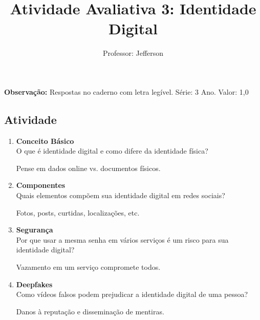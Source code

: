 \documentclass[11pt]{article}
\title{\textcolor{titleblue}{Atividade Avaliativa 3: Identidade Digital}}
\author{Professor: Jefferson}
\date{}
\begin{document}
\maketitle
\vspace{-1cm}

\begin{center}
    \large{\textbf{Observação:} Respostas no caderno com letra legível. \quad Série: 3 Ano. Valor: 1,0}
\end{center}

\begin{multicols}{2}

\section*{Atividade}
\begin{enumerate}

\item \textbf{Conceito Básico}\\
O que é identidade digital e como difere da identidade física?
\begin{tcolorbox}[colback=explanationbg,colframe=titleblue,title=Dica:]
Pense em dados online vs. documentos físicos.
\end{tcolorbox}

\item \textbf{Componentes}\\
Quais elementos compõem sua identidade digital em redes sociais?
\begin{tcolorbox}[colback=explanationbg,colframe=titleblue,title=Dica:]
Fotos, posts, curtidas, localizações, etc.
\end{tcolorbox}

\item \textbf{Segurança}\\
Por que usar a mesma senha em vários serviços é um risco para sua identidade digital?
\begin{tcolorbox}[colback=explanationbg,colframe=titleblue,title=Dica:]
Vazamento em um serviço compromete todos.
\end{tcolorbox}

\item \textbf{Deepfakes}\\
Como vídeos falsos podem prejudicar a identidade digital de uma pessoa?
\begin{tcolorbox}[colback=explanationbg,colframe=titleblue,title=Dica:]
Danos à reputação e disseminação de mentiras.
\end{tcolorbox}


\end{enumerate}
\end{multicols}
\end{document}
